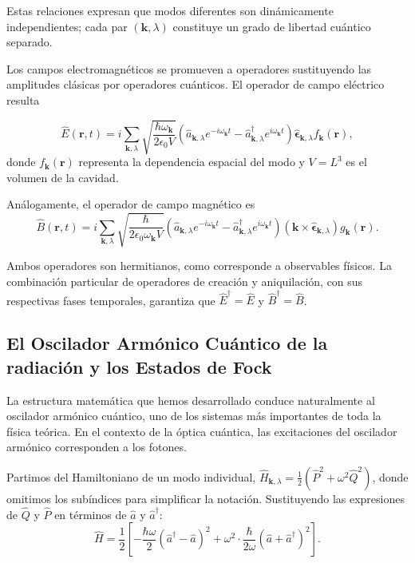         Estas relaciones expresan que modos diferentes son dinámicamente independientes; cada par $(\mathbf{k}, \lambda)$ constituye un grado de libertad cuántico separado.

        Los campos electromagnéticos se promueven a operadores sustituyendo las amplitudes clásicas por operadores cuánticos. El operador de campo eléctrico resulta

        \begin{equation}
            \hat{E}(\mathbf{r}, t) = i\sum_{\mathbf{k},\lambda} \sqrt{\frac{\hbar\omega_{\mathbf{k}}}{2\epsilon_0 V}} \left(\hat{a}_{\mathbf{k},\lambda} e^{-i\omega_{\mathbf{k}} t} - \hat{a}^\dagger_{\mathbf{k},\lambda} e^{i\omega_{\mathbf{k}} t}\right) \hat{\boldsymbol{\epsilon}}_{\mathbf{k},\lambda} f_{\mathbf{k}}(\mathbf{r}),
        \end{equation}
        donde $f_{\mathbf{k}}(\mathbf{r})$ representa la dependencia espacial del modo y $V = L^3$ es el volumen de la cavidad.
        
        Análogamente, el operador de campo magnético es
        \begin{equation}
            \hat{B}(\mathbf{r}, t) = i\sum_{\mathbf{k},\lambda} \sqrt{\frac{\hbar}{2\epsilon_0\omega_{\mathbf{k}} V}} \left(\hat{a}_{\mathbf{k},\lambda} e^{-i\omega_{\mathbf{k}} t} - \hat{a}^\dagger_{\mathbf{k},\lambda} e^{i\omega_{\mathbf{k}} t}\right) (\mathbf{k} \times \hat{\boldsymbol{\epsilon}}_{\mathbf{k},\lambda}) g_{\mathbf{k}}(\mathbf{r}).
        \end{equation}
        
        Ambos operadores son hermitianos, como corresponde a observables físicos. La combinación particular de operadores de creación y aniquilación, con sus respectivas fases temporales, garantiza que $\hat{E}^\dagger = \hat{E}$ y $\hat{B}^\dagger = \hat{B}$.


    \subsection{El Oscilador Armónico Cuántico de la radiación y los Estados de Fock}
        
        La estructura matemática que hemos desarrollado conduce naturalmente al oscilador armónico cuántico, uno de los sistemas más importantes de toda la física teórica. En el contexto de la óptica cuántica, las excitaciones del oscilador armónico corresponden a los fotones.

        Partimos del Hamiltoniano de un modo individual, $\hat{H}_{\mathbf{k},\lambda} = \frac{1}{2}(\hat{P}^2 + \omega^2\hat{Q}^2)$, donde omitimos los subíndices para simplificar la notación. Sustituyendo las expresiones de $\hat{Q}$ y $\hat{P}$ en términos de $\hat{a}$ y $\hat{a}^\dagger$:
        \begin{equation}
            \hat{H} = \frac{1}{2}\left[-\frac{\hbar\omega}{2}(\hat{a}^\dagger - \hat{a})^2 + \omega^2 \cdot \frac{\hbar}{2\omega}(\hat{a} + \hat{a}^\dagger)^2\right].
        \end{equation}
        

